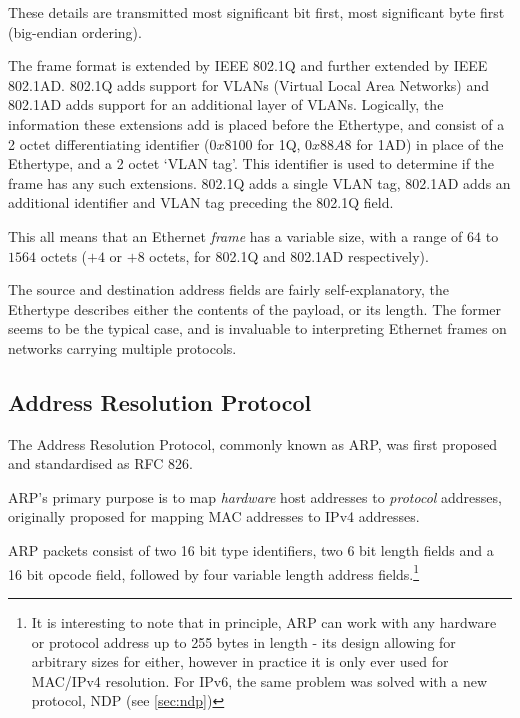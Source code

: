 \documentclass[10pt,a4paper,notitlepage]{report}
\begin{document}
These details are transmitted most significant bit first, most significant byte first (big-endian ordering).

The frame format is extended by IEEE 802.1Q and further extended by IEEE 802.1AD. 802.1Q adds support for VLANs (Virtual Local Area Networks) and 802.1AD adds support for an additional layer of VLANs.
Logically, the information these extensions add is placed before the Ethertype, and consist of a 2 octet differentiating identifier ($0x8100$ for 1Q, $0x88A8$ for 1AD) in place of the Ethertype, and a 2 octet `VLAN tag'. This identifier is used to determine if the frame has any such extensions. 802.1Q adds a single VLAN tag, 802.1AD adds an additional identifier and VLAN tag preceding the 802.1Q field.

This all means that an Ethernet \emph{frame} has a variable size, with a range of $64$ to $1564$ octets ($+4$ or $+8$ octets, for 802.1Q and 802.1AD respectively).

The source and destination address fields are fairly self-explanatory, the Ethertype describes either the contents of the payload, or its length. The former seems to be the typical case, and is invaluable to interpreting Ethernet frames on networks carrying multiple protocols.

\subsection{Address Resolution Protocol}
\label{sec:arp}
The Address Resolution Protocol, commonly known as ARP, was first proposed and standardised as RFC 826\cite{rfc826}.

ARP's primary purpose is to map \emph{hardware} host addresses to \emph{protocol} addresses, originally proposed for mapping MAC addresses to IPv4 addresses.

ARP packets consist of two 16 bit type identifiers, two 6 bit length fields and a 16 bit opcode field, followed by four variable length address fields.\footnote{It is interesting to note that in principle, ARP can work with any hardware or protocol address up to 255 bytes in length - its design allowing for arbitrary sizes for either, however in practice it is only ever used for MAC/IPv4 resolution. For IPv6, the same problem was solved with a new protocol, NDP (see \ref{sec:ndp})}
\end{document}
